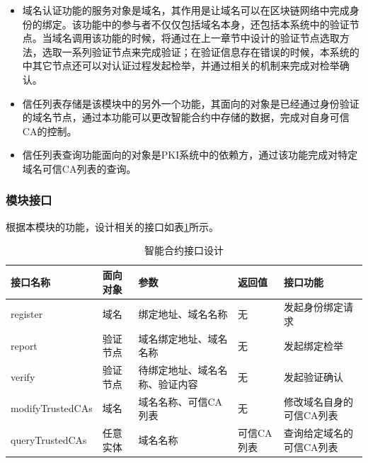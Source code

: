 \begin{itemize}
	\item 
	\noindent{}

	域名认证功能的服务对象是域名，其作用是让域名可以在区块链网络中完成身份的绑定。该功能中的参与者不仅仅包括域名本身，还包括本系统中的验证节点。当域名调用该功能的时候，将通过在上一章节中设计的验证节点选取方法，选取一系列验证节点来完成验证；在验证信息存在错误的时候，本系统的中其它节点还可以对认证过程发起检举，并通过相关的机制来完成对检举确认。

	\item 
	\noindent{}

	信任列表存储是该模块中的另外一个功能，其面向的对象是已经通过身份验证的域名节点，通过本功能可以更改智能合约中存储的数据，完成对自身可信CA的控制。

	\item
	\noindent{}

	信任列表查询功能面向的对象是PKI系统中的依赖方，通过该功能完成对特定域名可信CA列表的查询。

\end{itemize}


\subsubsection{模块接口}


根据本模块的功能，设计相关的接口如表\ref{table:smartContractInterface}所示。

\begin{table}[h] %
\centering
\begin{tabular}{p{3.2cm}|p{2cm}|p{2.5cm}|p{2cm}|p{4cm}} %
\hline  
 接口名称 & 面向对象 & 参数 & 返回值 & 接口功能\\ %
\hline
register & 域名 & 绑定地址、域名名称 & 无 & 发起身份绑定请求 \\
\hline 
report & 验证节点 & 域名绑定地址、域名名称 & 无 & 发起绑定检举 \\
\hline 
verify & 验证节点 & 待绑定地址、域名名称、验证内容 & 无 & 发起验证确认 \\
\hline 
modifyTrustedCAs & 域名 & 域名名称、可信CA列表 & 无 & 修改域名自身的可信CA列表 \\
\hline 
queryTrustedCAs & 任意实体 & 域名名称 & 可信CA列表 & 查询给定域名的可信CA列表 \\
\hline 
\end{tabular}  
\caption{智能合约接口设计}\label{table:smartContractInterface} %
\end{table} 

